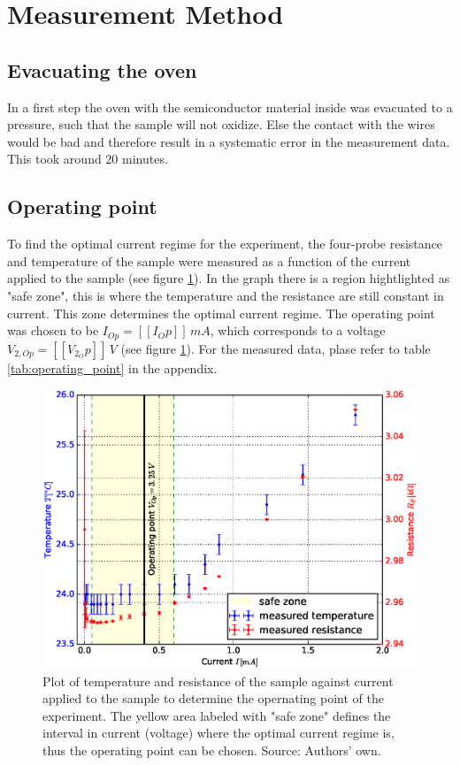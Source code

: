 \documentclass[a4paper]{article}
\begin{document}
\section{Measurement Method}

\subsection{Evacuating the oven}

In a first step the oven with the semiconductor material inside was evacuated to a pressure, such that the sample will not oxidize. Else the contact with the wires would be bad and therefore result in a systematic error in the measurement data. This took around $20$ minutes.

\subsection{Operating point}
\label{sec:operating_point}

To find the optimal current regime for the experiment, the four-probe resistance and temperature of the sample were measured as a function of the current applied to the sample (see figure \ref{fig:operating_point}). In the graph there is a region hightlighted as "safe zone", this is where the temperature and the resistance are still constant in current. This zone determines the optimal current regime. The operating point was chosen to be $I_{Op} = [[I_Op]] \, mA$, which corresponds to a voltage $V_{2,Op} = [[V_2_Op]] \, V$ (see figure \ref{fig:operating_point}). For the measured data, plase refer to table \ref{tab:operating_point} in the appendix.

\begin{figure}[H]
\captionsetup{singlelinecheck=off}
\centering
\includegraphics[width=1.0\textwidth]{plots/operating_point.eps}
\caption[blubb]{Plot of temperature and resistance of the sample against current applied to the sample to determine the opernating point of the experiment. The yellow area labeled with "safe zone" defines the interval in current (voltage) where the optimal current regime is, thus the operating point can be chosen. Source: Authors' own.}
\label{fig:operating_point}
\end{figure}
\end{document}

